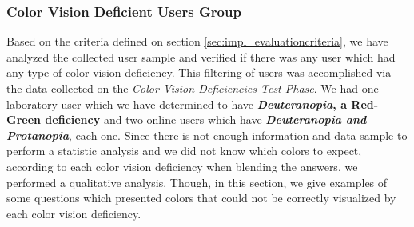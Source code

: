 \subsubsection{Color Vision Deficient Users Group}
\label{subsubsec:demo_daltonic}
%
Based on the criteria defined on section \ref{sec:impl_evaluationcriteria}, we have analyzed the collected user sample and verified if there was any user which had any type of color vision deficiency. This filtering of users was accomplished via the data collected on the \emph{Color Vision Deficiencies Test
Phase}. We had \ul{one laboratory user} which we have determined to have \textbf{\emph{Deuteranopia}, a Red-Green deficiency} and \ul{two online users} which have \textbf{\emph{Deuteranopia and Protanopia}}, each one. Since there is not enough information and data sample to perform a statistic analysis and we
did not know which colors to expect, according to each color vision deficiency when blending the answers, we performed a qualitative analysis. Though, in this section, we give examples of some questions which presented colors that could not be correctly visualized by each color vision deficiency. \par
%
